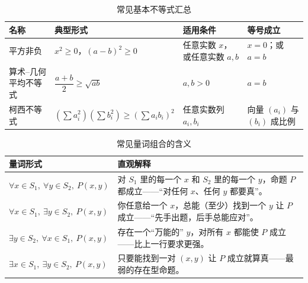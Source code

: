 \documentclass[a4paper,11pt]{ctexart}
\begin{document}
  \begin{table}[htbp]
    \centering
    \caption{常见基本不等式汇总}
    \begin{tabularx}{0.98\textwidth}{>{\raggedright\arraybackslash}p{2.8cm} X X X}
      \toprule
      \textbf{名称} & \textbf{典型形式} & \textbf{适用条件} & \textbf{等号成立} \\
      \midrule
      平方非负 & $x^2\ge 0$，$(a-b)^2\ge 0$ & 任意实数 $x$，或任意实数 $a,b$ & $x=0$；或 $a=b$ \\
      算术–几何平均不等式 & $\dfrac{a+b}{2}\ge\sqrt{ab}$ & $a,b>0$ & $a=b$ \\
      柯西不等式 & $(\sum a_i^2)(\sum b_i^2)\ge(\sum a_ib_i)^2$ & 任意实数列 $a_i,b_i$ & 向量 $(a_i)$ 与 $(b_i)$ 成比例 \\
      \bottomrule
    \end{tabularx}
  \end{table}

  \begin{table}[htbp]
    \centering
    \caption{常见量词组合的含义}
    \begin{tabularx}{0.98\textwidth}{>{\raggedright\arraybackslash}p{3.4cm} X}
      \toprule
      \textbf{量词形式} & \textbf{直观解释} \\
      \midrule
      $\forall x\in S_1,\ \forall y\in S_2,\ P(x,y)$
        & 对 $S_1$ 里的每一个 $x$ 和 $S_2$ 里的每一个 $y$，命题 $P$ 都成立——“对任何 $x$、任何 $y$ 都要真”。 \\
      $\forall x\in S_1,\ \exists y\in S_2,\ P(x,y)$
        & 你任意给一个 $x$，总能（至少）找到一个 $y$ 让 $P$ 成立——“先手出题，后手总能应对”。 \\
      $\exists y\in S_2,\ \forall x\in S_1,\ P(x,y)$
        & 存在一个“万能的” $y$，对所有 $x$ 都能使 $P$ 成立——比上一行要求更强。 \\
      $\exists x\in S_1,\ \exists y\in S_2,\ P(x,y)$
        & 只要能找到一对 $(x,y)$ 让 $P$ 成立就算真——最弱的存在型命题。 \\
      \bottomrule
    \end{tabularx}
  \end{table}

  \begin{center}
  \end{center}

\ifdefined\MathNoteBookMode\else
\end{document}

